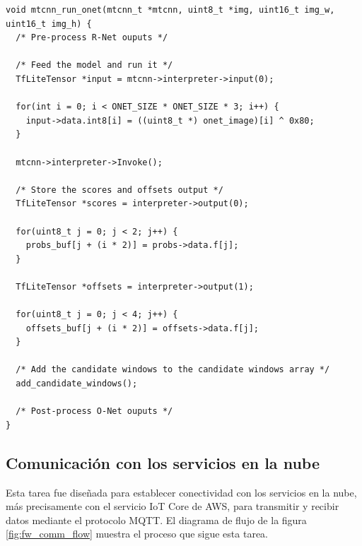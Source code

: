 \begin{lstlisting}[label=cod:run_onet,caption=Función mtcnn\_run\_onet.]
void mtcnn_run_onet(mtcnn_t *mtcnn, uint8_t *img, uint16_t img_w, uint16_t img_h) {
  /* Pre-process R-Net ouputs */
  
  /* Feed the model and run it */
  TfLiteTensor *input = mtcnn->interpreter->input(0);
    
  for(int i = 0; i < ONET_SIZE * ONET_SIZE * 3; i++) {
    input->data.int8[i] = ((uint8_t *) onet_image)[i] ^ 0x80;
  }
  
  mtcnn->interpreter->Invoke();
  
  /* Store the scores and offsets output */
  TfLiteTensor *scores = interpreter->output(0);
  
  for(uint8_t j = 0; j < 2; j++) {
    probs_buf[j + (i * 2)] = probs->data.f[j];
  }

  TfLiteTensor *offsets = interpreter->output(1);

  for(uint8_t j = 0; j < 4; j++) {
    offsets_buf[j + (i * 2)] = offsets->data.f[j];
  }
  
  /* Add the candidate windows to the candidate windows array */
  add_candidate_windows();
  
  /* Post-process O-Net ouputs */
}
\end{lstlisting}

\subsection{Comunicación con los servicios en la nube}
Esta tarea fue diseñada para establecer conectividad con los servicios en la nube, más precisamente con el servicio IoT Core de AWS, para transmitir y recibir datos mediante el protocolo MQTT. El diagrama de flujo de la figura \ref{fig:fw_comm_flow} muestra el proceso que sigue esta tarea.

